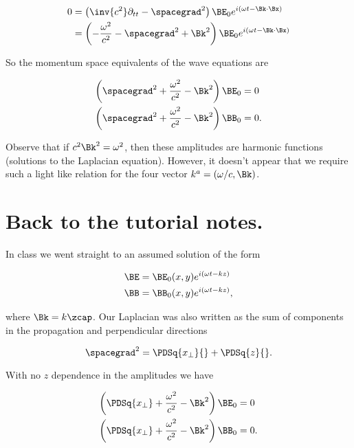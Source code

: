 \begin{align*}
0 &=
\left(\inv{c^2} \partial_{tt} - \spacegrad^2 \right) \BE_0 e^{i (\omega t - \Bk \cdot \Bx)} \\
&=
\left(-\frac{\omega^2}{c^2} - \spacegrad^2 + \Bk^2 \right) \BE_0 e^{i (\omega t - \Bk \cdot \Bx)}
\end{align*}

So the momentum space equivalents of the wave equations are

\begin{align}\label{eqn:relativisticElectrodynamicsT4:170}
\left( \spacegrad^2 +\frac{\omega^2}{c^2} - \Bk^2 \right) \BE_0 &= 0 \\
\left( \spacegrad^2 +\frac{\omega^2}{c^2} - \Bk^2 \right) \BB_0 &= 0.
\end{align}

Observe that if $c^2 \Bk^2 = \omega^2$, then these amplitudes are harmonic functions (solutions to the Laplacian equation).  However, it doesn't appear that we require such a light like relation for the four vector $k^a = (\omega/c, \Bk)$.

\section{Back to the tutorial notes.}

In class we went straight to an assumed solution of the form

\begin{align}\label{eqn:relativisticElectrodynamicsT4:190}
\BE &= \BE_0(x, y) e^{ i(\omega t - k z) } \\
\BB &= \BB_0(x, y) e^{ i(\omega t - k z) },
\end{align}

where $\Bk = k \zcap$.  Our Laplacian was also written as the sum of components in the propagation and perpendicular directions

\begin{equation}\label{eqn:relativisticElectrodynamicsT4:210}
\spacegrad^2 = \PDSq{x_\perp}{} + \PDSq{z}{}.
\end{equation}

With no $z$ dependence in the amplitudes we have

\begin{align}\label{eqn:relativisticElectrodynamicsT4:170}
\left( \PDSq{x_\perp} +\frac{\omega^2}{c^2} - \Bk^2 \right) \BE_0 &= 0 \\
\left( \PDSq{x_\perp} +\frac{\omega^2}{c^2} - \Bk^2 \right) \BB_0 &= 0.
\end{align}


